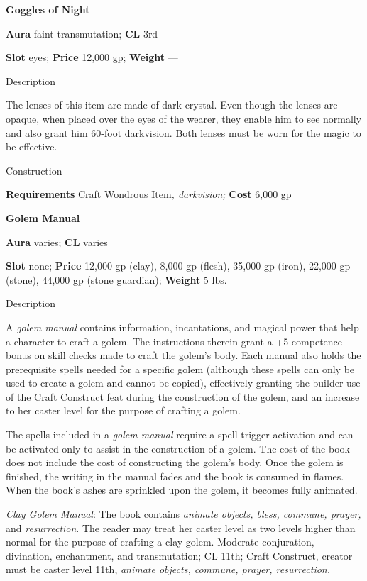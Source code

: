 \textbf{Goggles of Night}
				
\textbf{Aura} faint transmutation;\textbf{ CL }3rd
				
\textbf{Slot} eyes; \textbf{Price} 12,000 gp; \textbf{Weight }---
				
Description
				
The lenses of this item are made of dark crystal. Even though the lenses are opaque, when placed over the eyes of the wearer, they enable him to see normally and also grant him 60-foot darkvision. Both lenses must be worn for the magic to be effective. 
				
Construction
				
\textbf{Requirements} Craft Wondrous Item\textit{, darkvision;}\textbf{ Cost }6,000 gp
				
\textbf{Golem Manual}
				
\textbf{Aura} varies;\textbf{ CL }varies
				
\textbf{Slot} none; \textbf{Price} 12,000 gp (clay), 8,000 gp (flesh), 35,000 gp (iron), 22,000 gp (stone), 44,000 gp (stone guardian); \textbf{Weight} 5 lbs.
				
Description
				
A \textit{golem manual} contains information, incantations, and magical power that help a character to craft a golem. The instructions therein grant a +5 competence bonus on skill checks made to craft the golem's body. Each manual also holds the prerequisite spells needed for a specific golem (although these spells can only be used to create a golem and cannot be copied), effectively granting the builder use of the Craft Construct feat during the construction of the golem, and an increase to her caster level for the purpose of crafting a golem.
				
The spells included in a \textit{golem manual} require a spell trigger activation and can be activated only to assist in the construction of a golem. The cost of the book does not include the cost of constructing the golem's body. Once the golem is finished, the writing in the manual fades and the book is consumed in flames. When the book's ashes are sprinkled upon the golem, it becomes fully animated.
				
\textit{Clay Golem Manual}: The book contains \textit{animate objects, bless, commune, prayer, }and \textit{resurrection}. The reader may treat her caster level as two levels higher than normal for the purpose of crafting a clay golem. Moderate conjuration, divination, enchantment, and transmutation; CL 11th; Craft Construct, creator must be caster level 11th,\textit{ animate objects, commune, prayer, resurrection.}
				
